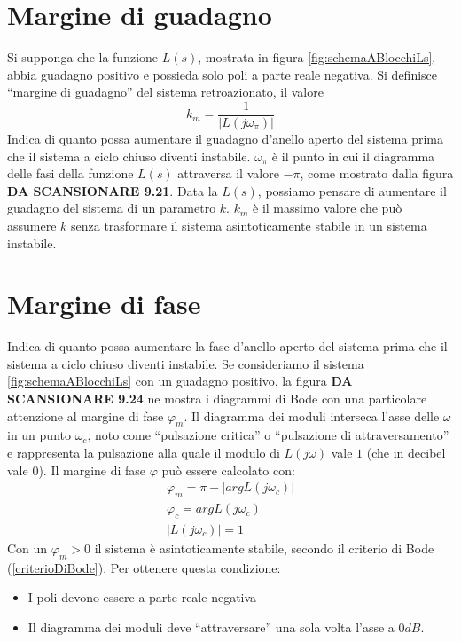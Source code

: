 \documentclass[a4paper]{report}
\newcommand{\bo}{\bfseries }
\begin{document}
\section{Margine di guadagno}

Si supponga che la funzione $L(s)$, mostrata in figura
\ref{fig:schemaABlocchiLs}, abbia guadagno positivo e possieda solo
poli a parte reale negativa. Si definisce ``margine di guadagno'' del
sistema retroazionato, il valore
\[
k_m = \dfrac{1}{|L(j \omega_\pi)|}
\]
Indica di quanto possa aumentare il guadagno d'anello aperto del sistema
prima che il sistema a ciclo chiuso diventi instabile.
$\omega_{\pi}$ \`e il punto in cui il diagramma delle fasi della funzione
$L(s)$ attraversa il valore $-\pi$, come mostrato dalla figura {\bo DA
  SCANSIONARE 9.21}. Data la $L(s)$, possiamo pensare di aumentare il
guadagno del sistema di un parametro $k$. $k_m$ \`e il massimo valore
che pu\`o assumere $k$ senza trasformare il sistema asintoticamente
stabile in un sistema instabile.
\section{Margine di fase}
Indica di quanto possa aumentare la fase d'anello aperto del sistema
prima che il sistema a ciclo chiuso diventi instabile.
Se consideriamo il sistema \ref{fig:schemaABlocchiLs} con un guadagno
positivo, la figura {\bo DA SCANSIONARE 9.24} ne mostra i diagrammi di
Bode con una particolare attenzione al margine di fase $\varphi_m$. Il
diagramma dei moduli interseca l'asse delle $\omega$ in un punto
$\omega_c$, noto come ``pulsazione critica'' o ``pulsazione di attraversamento'' e rappresenta la pulsazione alla quale il modulo di
$L(j \omega)$ vale $1$ (che in decibel vale 0). Il margine di fase
$\varphi$ pu\`o essere calcolato con:
\[
\begin{array}{l}
  \varphi_m = \pi - |arg L(j \omega_c)|\\
  \varphi_c = arg L(j \omega_c)\\
  |L(j \omega_c)| = 1
\end{array}
\]
Con un $\varphi_m > 0$ il sistema \`e asintoticamente stabile, secondo
il criterio di Bode (\ref{criterioDiBode}). Per ottenere questa
condizione: 
\begin{itemize}
\item I poli devono essere a parte reale negativa
\item Il diagramma dei moduli deve ``attraversare'' una sola volta
  l'asse a $0 dB$.
\end{itemize}
\end{document}

